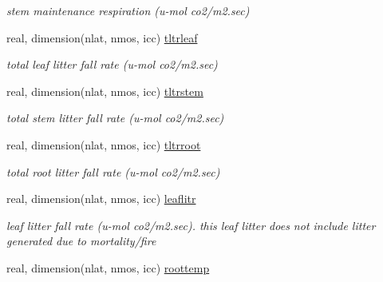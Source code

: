 \begin{DoxyCompactItemize}
\begin{DoxyCompactList}\small\item\em stem maintenance respiration (u-\/mol co2/m2.\+sec) \end{DoxyCompactList}\item 
\hypertarget{structctem__statevars_1_1veg__rot_a3657efb1a7ff4046ea714ec5d378ce2f}{}real, dimension(nlat, nmos, icc) \hyperlink{structctem__statevars_1_1veg__rot_a3657efb1a7ff4046ea714ec5d378ce2f}{tltrleaf}\label{structctem__statevars_1_1veg__rot_a3657efb1a7ff4046ea714ec5d378ce2f}

\begin{DoxyCompactList}\small\item\em total leaf litter fall rate (u-\/mol co2/m2.\+sec) \end{DoxyCompactList}\item 
\hypertarget{structctem__statevars_1_1veg__rot_a53c6c9c0e5280ed4a0a793bc89afe8c6}{}real, dimension(nlat, nmos, icc) \hyperlink{structctem__statevars_1_1veg__rot_a53c6c9c0e5280ed4a0a793bc89afe8c6}{tltrstem}\label{structctem__statevars_1_1veg__rot_a53c6c9c0e5280ed4a0a793bc89afe8c6}

\begin{DoxyCompactList}\small\item\em total stem litter fall rate (u-\/mol co2/m2.\+sec) \end{DoxyCompactList}\item 
\hypertarget{structctem__statevars_1_1veg__rot_a39b7c448d5708e95513b182b6bbb59c5}{}real, dimension(nlat, nmos, icc) \hyperlink{structctem__statevars_1_1veg__rot_a39b7c448d5708e95513b182b6bbb59c5}{tltrroot}\label{structctem__statevars_1_1veg__rot_a39b7c448d5708e95513b182b6bbb59c5}

\begin{DoxyCompactList}\small\item\em total root litter fall rate (u-\/mol co2/m2.\+sec) \end{DoxyCompactList}\item 
\hypertarget{structctem__statevars_1_1veg__rot_a9012191a2d438f4201c5e923176e511e}{}real, dimension(nlat, nmos, icc) \hyperlink{structctem__statevars_1_1veg__rot_a9012191a2d438f4201c5e923176e511e}{leaflitr}\label{structctem__statevars_1_1veg__rot_a9012191a2d438f4201c5e923176e511e}

\begin{DoxyCompactList}\small\item\em leaf litter fall rate (u-\/mol co2/m2.\+sec). this leaf litter does not include litter generated due to mortality/fire \end{DoxyCompactList}\item 
\hypertarget{structctem__statevars_1_1veg__rot_ab9186fd57e63defb19a616e69391375c}{}real, dimension(nlat, nmos, icc) \hyperlink{structctem__statevars_1_1veg__rot_ab9186fd57e63defb19a616e69391375c}{roottemp}\label{structctem__statevars_1_1veg__rot_ab9186fd57e63defb19a616e69391375c}


\end{DoxyCompactItemize}
